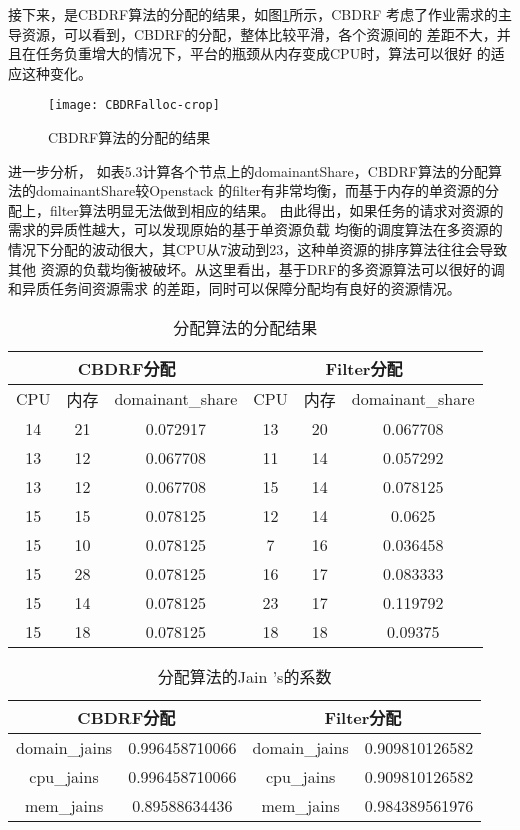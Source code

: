接下来，是CBDRF算法的分配的结果，如图\ref{fig:CBDRFalloc}所示，CBDRF
考虑了作业需求的主导资源，可以看到，CBDRF的分配，整体比较平滑，各个资源间的
差距不大，并且在任务负重增大的情况下，平台的瓶颈从内存变成CPU时，算法可以很好
的适应这种变化。
\begin{figure}[htbp]
\centering\texttt{[image: CBDRFalloc-crop]}
\caption{CBDRF算法的分配的结果}\label{fig:CBDRFalloc}
\end{figure}

进一步分析， 如表5.3计算各个节点上的domainantShare，CBDRF算法的分配算法的domainantShare较Openstack
的filter有非常均衡，而基于内存的单资源的分配上，filter算法明显无法做到相应的结果。
由此得出，如果任务的请求对资源的需求的异质性越大，可以发现原始的基于单资源负载
均衡的调度算法在多资源的情况下分配的波动很大，其CPU从7波动到23，这种单资源的排序算法往往会导致其他
资源的负载均衡被破坏。从这里看出，基于DRF的多资源算法可以很好的调和异质任务间资源需求
的差距，同时可以保障分配均有良好的资源情况。
\begin{table}[htp]
\begin{center} 
\caption{分配算法的分配结果}
\begin{tabular}{|c|c|c|c|c|c|}
\hline
\multicolumn{3}{|c|}{CBDRF分配} & \multicolumn{3}{|c|}{Filter分配} \\
\hline
CPU & 内存 & domainant\_share &CPU & 内存 & domainant\_share\\
\hline
14&21&0.072917&13&20&0.067708\\
\hline
13&12&0.067708&11&14&0.057292\\
\hline
13&12&0.067708&15&14&0.078125\\
\hline
15&15&0.078125&12&14&0.0625\\
\hline
15&10&0.078125&7&16&0.036458\\
\hline
15&28&0.078125&16&17&0.083333\\
\hline
15&14&0.078125&23&17&0.119792\\
\hline
15&18&0.078125&18&18&0.09375\\
\hline
\end{tabular}
\end{center}
\label{tab:allocres}
\end{table}

\begin{table}[htp]
\begin{center} 
\caption{分配算法的Jain 's的系数}
\begin{tabular}{|c|c|c|c|}
\hline
\multicolumn{2}{|c|}{CBDRF分配} & \multicolumn{2}{|c|}{Filter分配} \\
\hline
domain\_jains& 0.996458710066&domain\_jains&0.909810126582\\
\hline 
cpu\_jains& 0.996458710066&cpu\_jains&0.909810126582\\
\hline
mem\_jains& 0.89588634436&mem\_jains&0.984389561976\\
\hline
\end{tabular}
\end{center}
\label{tab:jain}
\end{table}

